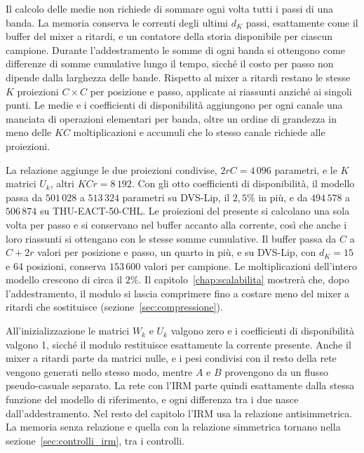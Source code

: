 \label{subsec:costo_memoria_intervalli}
Il calcolo delle medie non richiede di sommare ogni volta tutti i passi di una banda. La memoria conserva le correnti degli ultimi $d_K$ passi, esattamente come il buffer del mixer a ritardi, e un contatore della storia disponibile per ciascun campione. Durante l'addestramento le somme di ogni banda si ottengono come differenze di somme cumulative lungo il tempo, sicché il costo per passo non dipende dalla larghezza delle bande. Rispetto al mixer a ritardi restano le stesse $K$ proiezioni $C\times C$ per posizione e passo, applicate ai riassunti anziché ai singoli punti. Le medie e i coefficienti di disponibilità aggiungono per ogni canale una manciata di operazioni elementari per banda, oltre un ordine di grandezza in meno delle $KC$ moltiplicazioni e accumuli che lo stesso canale richiede alle proiezioni.

La relazione aggiunge le due proiezioni condivise, $2rC=4\,096$ parametri, e le $K$ matrici $U_k$, altri $KCr=8\,192$. Con gli otto coefficienti di disponibilità, il modello passa da $501\,028$ a $513\,324$ parametri su DVS-Lip, il $2{,}5\%$ in più, e da $494\,578$ a $506\,874$ su THU-EACT-50-CHL. Le proiezioni del presente si calcolano una sola volta per passo e si conservano nel buffer accanto alla corrente, così che anche i loro riassunti si ottengano con le stesse somme cumulative. Il buffer passa da $C$ a $C+2r$ valori per posizione e passo, un quarto in più, e su DVS-Lip, con $d_K=15$ e 64 posizioni, conserva $153\,600$ valori per campione. Le moltiplicazioni dell'intero modello crescono di circa il $2\%$. Il capitolo~\ref{chap:scalabilita} mostrerà che, dopo l'addestramento, il modulo si lascia comprimere fino a costare meno del mixer a ritardi che sostituisce (sezione~\ref{sec:compressione}).

All'inizializzazione le matrici $W_k$ e $U_k$ valgono zero e i coefficienti di disponibilità valgono 1, sicché il modulo restituisce esattamente la corrente presente. Anche il mixer a ritardi parte da matrici nulle, e i pesi condivisi con il resto della rete vengono generati nello stesso modo, mentre $A$ e $B$ provengono da un flusso pseudo-casuale separato. La rete con l'IRM parte quindi esattamente dalla stessa funzione del modello di riferimento, e ogni differenza tra i due nasce dall'addestramento. Nel resto del capitolo l'IRM usa la relazione antisimmetrica. La memoria senza relazione e quella con la relazione simmetrica tornano nella sezione~\ref{sec:controlli_irm}, tra i controlli.




